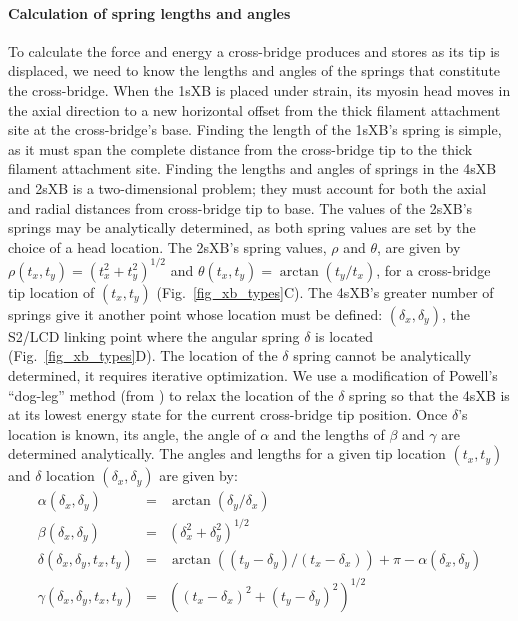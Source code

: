 \documentclass[]{article}
\begin{document}
\paragraph{Calculation of spring lengths and angles} %
To calculate the force and energy a cross-bridge produces and stores as its tip is displaced, we need to know the lengths and angles of the springs that constitute the cross-bridge. 
When the 1sXB is placed under strain, its myosin head moves in the axial direction to a new horizontal offset from the thick filament attachment site at the cross-bridge's base.
Finding the length of the 1sXB's spring is simple, as it must span the complete distance from the cross-bridge tip to the thick filament attachment site. 
Finding the lengths and angles of springs in the 4sXB and 2sXB is a two-dimensional problem; they must account for both the axial and radial distances from cross-bridge tip to base.
The values of the 2sXB's springs may be analytically determined, as both spring values are set by the choice of a head location. 
The 2sXB's spring values, $\rho$ and $\theta$, are given by $\rho(t_x, t_y)=(t_x^2 + t_y^2)^{1/2}$ and $\theta(t_x, t_y)=\arctan(t_y/t_x)$, for a cross-bridge tip location of $(t_x, t_y)$ (Fig.~\ref{fig_xb_types}C). 
The 4sXB's greater number of springs give it another point whose location must be defined: $(\delta_x, \delta_y)$, the S2/LCD linking point where the angular spring $\delta$ is located (Fig.~\ref{fig_xb_types}D). 
The location of the $\delta$ spring cannot be analytically determined, it requires iterative optimization. 
We use a modification of Powell's ``dog-leg'' method (from \citet{SciPy}) to relax the location of the $\delta$ spring so that the 4sXB is at its lowest energy state for the current cross-bridge tip position.
Once $\delta$'s location is known, its angle, the angle of $\alpha$ and the lengths of $\beta$ and $\gamma$ are determined analytically.
The angles and lengths for a given tip location $(t_x, t_y)$ and $\delta$ location $(\delta_x, \delta_y)$ are given by:
\begin{eqnarray*}
\label{4sXB_spring_values}
\alpha(\delta_x, \delta_y) &=& \arctan(\delta_y/\delta_x) \\
\beta(\delta_x, \delta_y) &=& (\delta_x^2 + \delta_y^2)^{1/2} \\
\delta(\delta_x, \delta_y, t_x, t_y) &=& \arctan((t_y-\delta_y)/(t_x-\delta_x)) + \pi - \alpha(\delta_x, \delta_y) \\
\gamma(\delta_x, \delta_y, t_x, t_y) &=& ((t_x-\delta_x)^2 + (t_y-\delta_y)^2)^{1/2} 
\end{eqnarray*}
\end{document}
